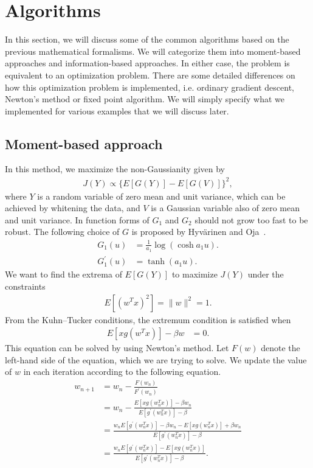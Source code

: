 \documentclass[aps,prl,preprint,superscriptaddress]{revtex4-2}
\begin{document}
\section{Algorithms}
In this section, we will discuss some of the common algorithms based on the previous mathematical formalisms. We will categorize them into moment-based approaches and information-based approaches. In either case, the problem is equivalent to an optimization problem. There are some detailed differences on how this optimization problem is implemented, i.e. ordinary gradient descent, Newton's method or fixed point algorithm. We will simply specify what we implemented for various examples that we will discuss later. 
\subsection{Moment-based approach}
In this method, we maximize the non-Gaussianity given by
\begin{align}
J(Y) \propto \{E[G(Y)] - E[G(V)]\}^2,
\end{align}
where $Y$ is a random variable of zero mean and unit variance, which can be achieved by whitening the data, and $V$ is a Gaussian variable also of zero mean and unit variance. In function forms of $G_1$ and $G_2$ should not grow too fast to be robust. The following choice of $G$ is proposed by Hyvärinen and Oja~\cite{hyvarinen2000independent}.
\begin{align}
G_1(u) &= \frac{1}{a_1} \log (\cosh a_1 u). \\
G_1^{\prime}(u) &= \tanh(a_1 u).
\end{align}
We want to find the extrema of $E[G(Y)]$ to maximize $J(Y)$ under the constraints
\begin{align}
E[(w^T x)^2] = \| w\|^2 = 1.
\end{align}
From the Kuhn--Tucker conditions, the extremum condition is satisfied when
\begin{align}
E[x g(w^Tx)] - \beta w &= 0.
\end{align}
This equation can be solved by using Newton's method.
Let $F(w)$ denote the left-hand side of the equation, which we are trying to solve.
We update the value of $w$ in each iteration according to the following equation.
\begin{align}
w_{n+1} &= w_n - \frac{F(w_n)}{F^{\prime}(w_n)} \\
&= w_n - \frac{E[x g (w_n^T x)] - \beta w_n}{E[g^{\prime}(w_n^T x)] - \beta} \\
&= \frac{w_n E[g^{\prime}(w_n^T x)] - \beta w_n - E[x g (w_n^T x)] + \beta w_n}{E[g^{\prime}(w_n^T x)] - \beta} \\
&= \frac{w_n E[g^{\prime}(w_n^T x)] - E[x g (w_n^T x)]}{E[g^{\prime}(w_n^T x)] - \beta}.
\end{align}
\end{document}
